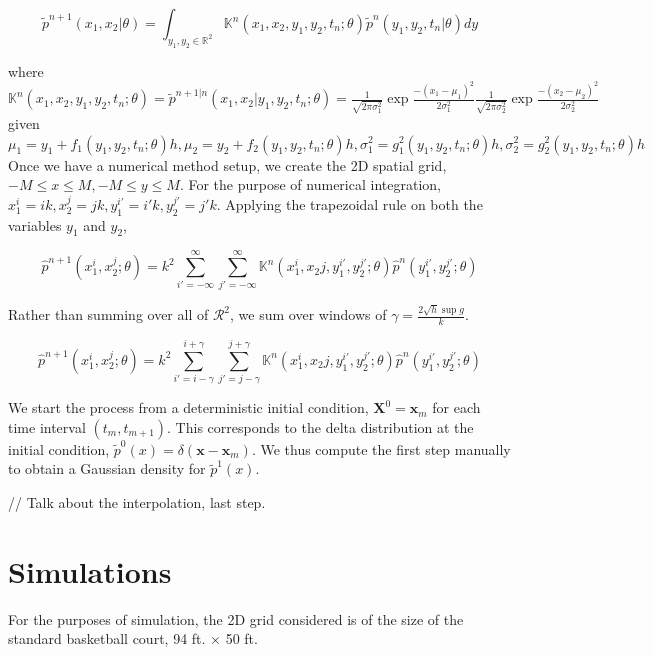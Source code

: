 \documentclass[a4paper,11pt]{article}
\begin{document}
\begin{equation}
\tilde{p}^{n+1} (x_1, x_2 | \theta) = \int_{y_1, y_2 \in \mathbb{R}^2} \mathbb{K}^{n}(x_1, x_2, y_1, y_2, t_n; \theta) \tilde{p}^n (y_1, y_2, t_n | \theta) dy
\end{equation}

where $\mathbb{K}^{n}(x_1, x_2, y_1, y_2, t_n; \theta) = \tilde{p}^{n+1 | n} (x_1, x_2 | y_1, y_2, t_n; \theta) = \frac{1}{\sqrt{2 \pi \sigma_1^2}} \exp \frac{-(x_1 - \mu_1)^2}{2\sigma^2_1} \frac{1}{\sqrt{2 \pi \sigma_2^2}} \exp \frac{-(x_2 - \mu_2)^2}{2\sigma^2_2}$ given
$\mu_1 = y_1 + f_1 (y_1, y_2, t_n ; \theta) h, \mu_2 = y_2 + f_2 (y_1, y_2, t_n ; \theta) h, \sigma_1^2 = g^2_1(y_1, y_2, t_n ; \theta) h, \sigma_2^2 = g^2_2 (y_1, y_2, t_n ; \theta) h$ \\

Once we have a numerical method setup, we create the 2D spatial grid, $-M \leq x \leq M, -M \leq y \leq M$. For the purpose of numerical integration, $x_1^i = ik, x_2^j = jk, y_1^{i'} = i'k, y_2^{j'} = j'k$. Applying the trapezoidal rule on both the variables $y_1$ and $y_2$,

\begin{equation}
\hat{p}^{n+1}(x_1^{i}, x_2^{j}; \theta) = k^2 \sum_{i' = -\infty}^{\infty} \sum_{j' = -\infty}^{\infty} \mathbb{K}^{n}(x_1^{i}, x_2{j}, y_1^{i'}, y_2^{j'}; \theta) \hat{p}^{n}(y_1^{i'}, y_2^{j'}; \theta)  
\end{equation}

Rather than summing over all of $\mathcal{R}^2$, we sum over windows of $\gamma = \frac{2 \sqrt{h} \sup{g}}{k}$.

\begin{equation}
\hat{p}^{n+1}(x_1^{i}, x_2^{j}; \theta) = k^2 \sum_{i' = i-\gamma}^{i+\gamma} \sum_{j' = j-\gamma}^{j+\gamma} \mathbb{K}^{n}(x_1^{i}, x_2{j}, y_1^{i'}, y_2^{j'}; \theta) \hat{p}^{n}(y_1^{i'}, y_2^{j'}; \theta)  
\end{equation}

We start the process from a deterministic initial condition, $\mathbf{X}^0 = \mathbf{x}_m$ for each time interval $ (t_m, t_{m+1})$. This corresponds to the delta distribution at the initial condition, $\tilde{p}^0(x) = \delta(\mathbf{x} - \mathbf{x}_m)$. We thus compute the first step manually to obtain a Gaussian density for $\tilde{p}^{1}(x)$. 

// Talk about the interpolation, last step.

\section{Simulations}
For the purposes of simulation, the 2D grid considered is of the size of the standard basketball court, 94 ft. $\times$ 50 ft.  \\
\end{document}
